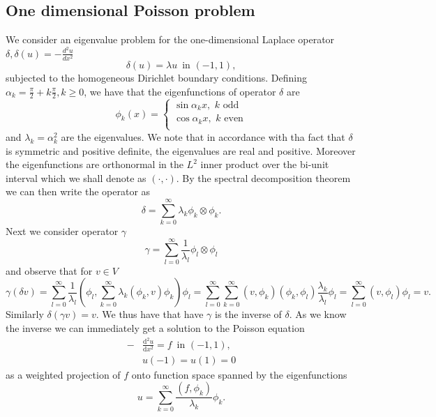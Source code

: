 \documentclass[a4paper,10pt]{article}
\newcommand{\inner}[2]{\ensuremath{\left(#1, #2\right)}}
\newcommand{\deriv}[2]{\ensuremath{\frac{\mathrm{d}#1}{\mathrm{d}#2}}}
\begin{document}
  \subsection{One dimensional Poisson problem}
  We consider an eigenvalue problem for the one-dimensional Laplace operator
  $\delta, \delta(u) = -\tfrac{d^2u}{dx^2}$
  \begin{equation}
  \label{eq:eig_pos1}
    \delta(u) = \lambda u \,\text{ in }(-1, 1),
  \end{equation}
  subjected to the homogeneous Dirichlet boundary conditions.
  Defining $\alpha_k = \frac{\pi}{2} + k\frac{\pi}{2}, k\geq0$, we have that the
  eigenfunctions of operator $\delta$ are
  \[
  \phi_k(x) = \begin{cases}
                \sin{\alpha_k x},\,\,k\,\,\text{odd}\\
                \cos{\alpha_k x},\,\,k\,\,\text{even}\\
              \end{cases}
  \]
  and $\lambda_k = \alpha_k^2$ are the eigenvalues. We note that in accordance
  with tha fact that $\delta$ is symmetric and positive definite, the eigenvalues
  are real and positive. Moreover the eigenfunctions are orthonormal in the $L^2$
  inner product over the bi-unit interval which we shall denote as
  $\inner{\cdot}{\cdot}$. By the spectral decomposition theorem
  we can then write the operator as
  \[
    \delta = \sum_{k=0}^{\infty} \lambda_k \phi_k \otimes \phi_k.
  \]
  Next we consider operator $\gamma$
  \[
    \gamma = \sum_{l=0}^{\infty} \frac{1}{\lambda_l} \phi_l \otimes \phi_l
  \]
  and observe that for $v\in V$
  \[
    \gamma\left(\delta v \right) = 
    \sum_{l=0}^{\infty} \frac{1}{\lambda_l}
    \inner{\phi_l}{\sum_{k=0}^{\infty} \lambda_k\inner{\phi_k}{v}\phi_k}\phi_l=
    \sum_{l=0}^{\infty}\sum_{k=0}^{\infty}\inner{v}{\phi_k}\inner{\phi_k}{\phi_l}\frac{\lambda_k}{\lambda_l}\phi_l =
    \sum_{l=0}^{\infty}\inner{v}{\phi_l}\phi_l = 
    v.
  \] 
  Similarly $\delta\left(\gamma v\right)=v$. We thus have that have $\gamma$ is
  the inverse of $\delta$. As we know the inverse we can immediately get a 
  solution to the Poisson equation
  \begin{equation}
  \label{eq:poisson_strong_1}
  \begin{aligned}
    -&\deriv{^2u}{x^2} = f\,\text{ in }(-1, 1),\\
     &u(-1) = u(1) = 0
  \end{aligned}
  \end{equation}
  as a weighted projection of $f$ onto function space spanned by the
  eigenfunctions
  \begin{equation}
  \label{eq:poisson_1d_sol}
  u = \sum_{k=0}^{\infty} \frac{\inner{f}{\phi_k}}{\lambda_k} \phi_k.
  \end{equation}
\end{document}
